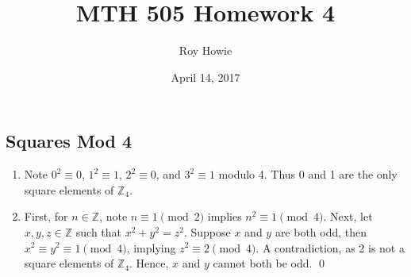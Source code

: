 \documentclass{article}
\newcommand{\Z}{\mathbb{Z}}
\begin{document}
\title{\vspace{-3cm}MTH 505 Homework 4}
\author{Roy Howie}
\date{April 14, 2017}
\maketitle

\subsection{Squares Mod 4}
  \begin{enumerate}[label=\textbf{(\alph*)}]
    \item{
      Note $0^2\equiv0$, $1^2\equiv1$, $2^2\equiv0$, and $3^2\equiv1$ modulo 4.
      Thus 0 and 1 are the only square elements of $\Z_4$.
    }
    \item{
      First, for $n\in\Z$, note $n\equiv1\pmod{2}$ implies $n^2\equiv1\pmod{4}$.
      Next, let $x,y,z\in\Z$ such that $x^2+y^2=z^2$. Suppose $x$ and $y$ are
      both odd, then $x^2\equiv y^2\equiv1\pmod{4}$, implying $z^2\equiv2
      \pmod{4}$. A contradiction, as 2 is not a square elements of $\Z_4$.
      Hence, $x$ and $y$ cannot both be odd.
      \qed
    }
  \end{enumerate}

\end{document}
